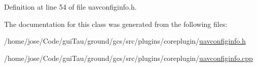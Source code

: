Definition at line 54 of file uavconfiginfo.\-h.



The documentation for this class was generated from the following files\-:\begin{DoxyCompactItemize}
\item 
/home/jose/\-Code/gui\-Tau/ground/gcs/src/plugins/coreplugin/\hyperlink{uavconfiginfo_8h}{uavconfiginfo.\-h}\item 
/home/jose/\-Code/gui\-Tau/ground/gcs/src/plugins/coreplugin/\hyperlink{uavconfiginfo_8cpp}{uavconfiginfo.\-cpp}\end{DoxyCompactItemize}
